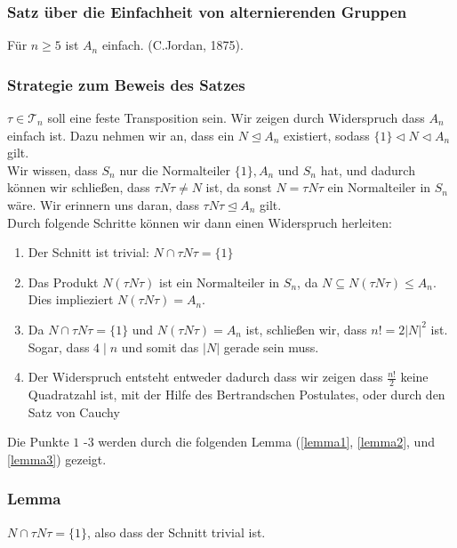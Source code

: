 \documentclass[12pt, german]{article}
\begin{document}
\subsubsection{Satz über die Einfachheit von alternierenden Gruppen}
	Für $n \geq 5$ ist $A_n$ einfach. (C.Jordan, 1875).

\subsubsection{Strategie zum Beweis des Satzes}
	$\tau \in \mathcal T_n$ soll eine feste Transposition sein. Wir zeigen durch Widerspruch dass $A_n$ einfach ist. Dazu nehmen wir an, dass ein $N \trianglelefteq A_n$ existiert, sodass $\{1\} \triangleleft N \triangleleft A_n$ gilt.  \\
	
	Wir wissen, dass $S_n$ nur die Normalteiler $\{1\}, A_n$ und $S_n$ hat, und dadurch können wir schließen, dass $\tau N\tau \not = N$ ist, da sonst $N = \tau N \tau $ ein Normalteiler in $S_n$ wäre. Wir erinnern uns daran, dass $\tau N \tau \trianglelefteq A_n$ gilt. \\
	Durch folgende Schritte können wir dann einen Widerspruch herleiten: 

\begin{enumerate}[label=\arabic*.]
	\item Der Schnitt ist trivial: $N \cap \tau N \tau = \{1\}$
	\item Das Produkt $N(\tau N \tau)$ ist ein Normalteiler in $S_n$, da $N \subseteq N(\tau N \tau) \leq A_n$. \\ 
		Dies implieziert $N(\tau N \tau) = A_n$.
	\item Da $N\cap \tau N \tau =  \{1\}$ und $N(  \tau N \tau ) = A_n$ ist, schließen wir, dass $n! = 2 |N|^2$ ist. Sogar, dass $4 \mid n$ und somit das $|N|$ gerade sein muss. 
 	\item Der Widerspruch entsteht entweder dadurch dass wir zeigen dass $\frac{n!}{2}$ keine Quadratzahl ist, mit der Hilfe des Bertrandschen Postulates, oder durch den Satz von Cauchy
\end{enumerate}
	Die Punkte $1$ -$3$ werden durch die folgenden Lemma (\ref{lemma1}, \ref{lemma2}, und \ref{lemma3}) gezeigt. 

\subsubsection{Lemma \label{lemma1}}
	$N \cap \tau N \tau = \{1\}$, also dass der Schnitt trivial ist.
\end{document}
